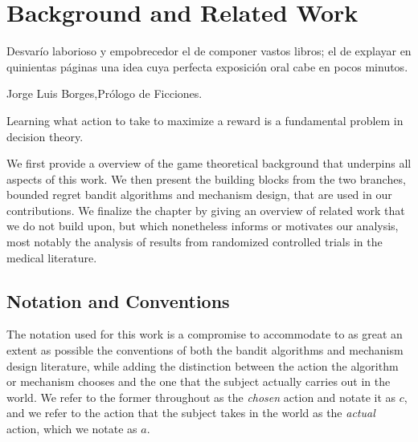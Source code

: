 \chapter{Background and Related Work}
\label{cha:background}

\epigraph{Desvar\'io laborioso y empobrecedor el de componer vastos libros; el de explayar en quinientas p\'aginas una idea cuya perfecta exposici\'on oral cabe en pocos minutos.}{Jorge Luis Borges,Pr\'ologo de Ficciones.}





Learning what action to take to maximize a reward is a fundamental problem in decision theory.


We first provide a overview of the game theoretical background that underpins all aspects of this work.
We then present the building blocks from the two branches, bounded regret bandit algorithms and mechanism design, that are used in our contributions.
We finalize the chapter by giving an overview of related work that we do not build upon, but which nonetheless informs or motivates our analysis, most notably the analysis of results from randomized controlled trials in the medical literature. 

\section{Notation and Conventions}


The notation used for this work is a compromise to accommodate to as great an extent as possible the conventions of both the bandit algorithms and mechanism design literature, while adding the distinction between the action the algorithm or mechanism chooses and the one that the subject actually carries out in the world. We refer to the former throughout as the \emph{chosen} action and notate it as $c$, and we refer to the action that the subject takes in the world as the \emph{actual} action, which we notate as $a$.

